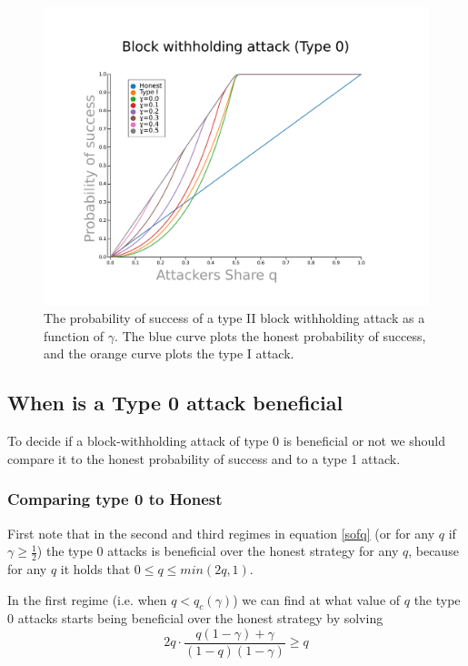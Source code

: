 \documentclass[letterpaper,12pt]{report}
\theoremstyle{plain}
\theoremstyle{definition}
\begin{document}
\begin{figure}[blockwithholdingtype2]
\centering
\includegraphics[width=200mm]{type0pos.pdf}
\caption{The probability of success of a type II block withholding attack as a function of $\gamma$. The blue curve plots the honest probability of success, and the orange curve plots the type I attack.}
\label{fig:type0pos}
\end{figure}

\subsection{When is a Type 0 attack beneficial}

To decide if a block-withholding attack of type 0 is beneficial or not we should compare it to the honest probability of success and to a type 1 attack. 

\subsubsection{Comparing type 0 to Honest}
First note that in the second and third regimes in equation \ref{sofq} (or for any $q$ if $\gamma\geq\frac{1}{2}$) the type 0 attacks is beneficial over the honest strategy for any $q$, because for any $q$ it holds that $0\leq q \leq min(2q,1)$. 

In the first regime (i.e. when $q<q_c(\gamma)$) we can find at what value of $q$ the type 0 attacks starts being beneficial over the honest strategy by solving
\begin{equation}\label{type0benefitonhonestequation}
2q\cdot\frac{q(1-\gamma)+\gamma}{(1-q)(1-\gamma)}\geq q
\end{equation}
\end{document}
